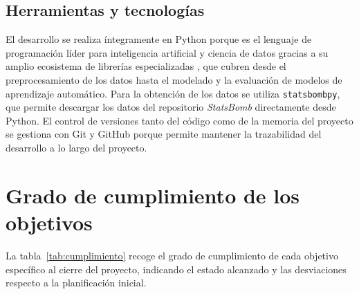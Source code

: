 \subsection{Herramientas y tecnologías}
El desarrollo se realiza íntegramente en Python porque es el lenguaje de programación líder para inteligencia artificial y ciencia de datos gracias a su amplio ecosistema de librerías especializadas \citep{raschka2020python}, que cubren desde el preprocesamiento de los datos hasta el modelado y la evaluación de modelos de aprendizaje automático. Para la obtención de los datos se utiliza \texttt{statsbombpy}, que permite descargar los datos del repositorio \textit{StatsBomb} directamente desde Python. El control de versiones tanto del código como de la memoria del proyecto se gestiona con Git y GitHub porque permite mantener la trazabilidad del desarrollo a lo largo del proyecto.

\section{Grado de cumplimiento de los objetivos}

La tabla~\ref{tab:cumplimiento} recoge el grado de cumplimiento de cada objetivo específico al cierre del proyecto, indicando el estado alcanzado y las desviaciones respecto a la planificación inicial.

